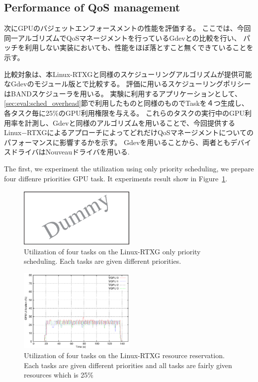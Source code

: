 \subsection{Performance of QoS management}

次にGPUのバジェットエンフォースメントの性能を評価する。
ここでは、今回同一アルゴリズムでQoSマネージメントを行っているGdevとの比較を行い、
パッチを利用しない実装においても、性能をほぼ落とすこと無くできていることを示す。

比較対象は、本Linux-RTXGと同様のスケジューリングアルゴリズムが提供可能なGdevのモジュール版とで比較する。
評価に用いるスケジューリングポリシーはBANDスケジューラを用いる。
実験に利用するアプリケーションとして、\ref{sec:eval:sched_overhead}節で利用したものと同様のものでTaskを４つ生成し、各タスク毎に25\%のGPU利用権限を与える。
これらのタスクの実行中のGPU利用率を計測し、Gdevと同様のアルゴリズムを用いることで、今回提供するLinux−RTXGによるアプローチによってどれだけQoSマネージメントについてのパフォーマンスに影響するかを示す。
Gdevを用いることから、両者ともデバイスドライバはNouveauドライバを用いる.

The first, we experiment the utilization using only priority scheduling, we prepare four diffenre priorities GPU task.
It experiments result show in Figure~\ref{fig:rtx_prio}.

\begin{figure}[t]
\begin{center}
\includegraphics[width=0.5\textwidth]{img/dummy}
\caption{Utilization of four tasks on the Linux-RTXG only priority scheduling. Each tasks are given different priorities.}
\end{center}
\label{fig:rtx_prio}
\end{figure}

\begin{figure}[t]
\begin{center}
\includegraphics[width=0.5\textwidth]{img/rtx_qos.eps}
\caption{Utilization of four tasks on the Linux-RTXG resource reservation. Each tasks are given different priorities and all tasks are fairly given resources which is 25\%}
\end{center}
\label{fig:qos_rtx}
\end{figure}

